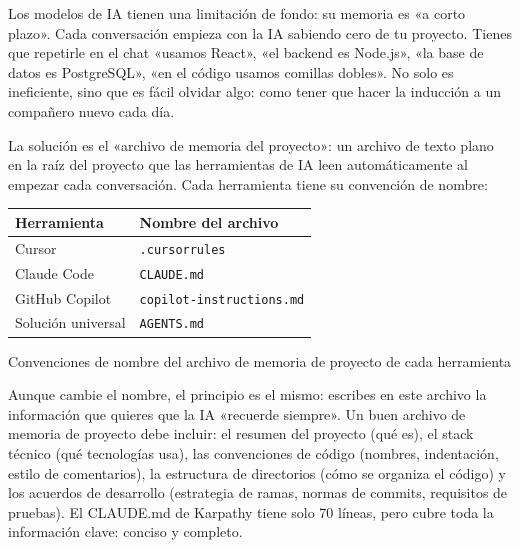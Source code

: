 


Los modelos de IA tienen una limitación de fondo: su memoria es «a corto plazo». Cada conversación empieza con la IA sabiendo cero de tu proyecto. Tienes que repetirle en el chat «usamos React», «el backend es Node.js», «la base de datos es PostgreSQL», «en el código usamos comillas dobles». No solo es ineficiente, sino que es fácil olvidar algo: como tener que hacer la inducción a un compañero nuevo cada día.

La solución es el «archivo de memoria del proyecto»: un archivo de texto plano en la raíz del proyecto que las herramientas de IA leen automáticamente al empezar cada conversación. Cada herramienta tiene su convención de nombre:

\begin{center}
\begin{tabularx}{\linewidth}{|X|X|}
\hline
\textbf{Herramienta} & \textbf{Nombre del archivo} \tabularnewline
\hline
Cursor & \texttt{.\allowbreak cursorrules} \tabularnewline
Claude Code & \texttt{CLAUDE.\allowbreak md} \tabularnewline
GitHub Copilot & \texttt{copilot-\allowbreak instructions.\allowbreak md} \tabularnewline
Solución universal & \texttt{AGENTS.\allowbreak md} \tabularnewline
\hline
\end{tabularx}
\end{center}

\begin{center}\small\color{gray}Convenciones de nombre del archivo de memoria de proyecto de cada herramienta\end{center}

Aunque cambie el nombre, el principio es el mismo: escribes en este archivo la información que quieres que la IA «recuerde siempre». Un buen archivo de memoria de proyecto debe incluir: el resumen del proyecto (qué es), el stack técnico (qué tecnologías usa), las convenciones de código (nombres, indentación, estilo de comentarios), la estructura de directorios (cómo se organiza el código) y los acuerdos de desarrollo (estrategia de ramas, normas de commits, requisitos de pruebas). El CLAUDE.md de Karpathy tiene solo 70 líneas, pero cubre toda la información clave: conciso y completo.

